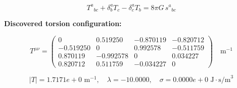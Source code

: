 
\begin{equation}
  T^a{}_{bc} + \delta^a_b T_c - \delta^a_c T_b = 8\pi G \, s^a{}_{bc}
\end{equation}

\textbf{Discovered torsion configuration:}

\begin{equation}
  T^{\mu\nu} = \begin{pmatrix}
    0 & 0.519250 & -0.870119 & -0.820712 \\
    -0.519250 & 0 & 0.992578 & -0.511759 \\
    0.870119 & -0.992578 & 0 & 0.034227 \\
    0.820712 & 0.511759 & -0.034227 & 0
  \end{pmatrix} \quad \text{m}^{-1}
\end{equation}

\begin{equation}
  |T| = 1.7171e+0 \text{ m}^{-1}, \quad
  \lambda = -10.0000, \quad
  \sigma = 0.0000e+0 \text{ J}\cdot\text{s/m}^3
\end{equation}